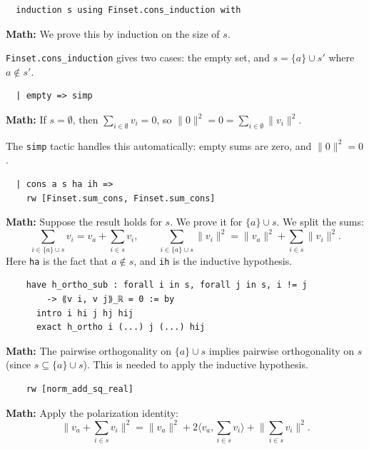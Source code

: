 \documentclass[11pt]{article}
\theoremstyle{plain}
\theoremstyle{definition}
\begin{document}
\begin{tcolorbox}[title=Line 6: Induction on the finite set]
\begin{lstlisting}
  induction s using Finset.cons_induction with
\end{lstlisting}
\textbf{Math:} We prove this by induction on the size of $s$.

\texttt{Finset.cons\_induction} gives two cases: the empty set, and
$s = \{a\} \cup s'$ where $a \notin s'$.
\end{tcolorbox}

\begin{tcolorbox}[title=Line 7: Base case (empty set)]
\begin{lstlisting}
  | empty => simp
\end{lstlisting}
\textbf{Math:} If $s = \emptyset$, then $\sum_{i \in \emptyset} v_i = 0$, so
$\|0\|^2 = 0 = \sum_{i \in \emptyset} \|v_i\|^2$.

The \texttt{simp} tactic handles this automatically: empty sums are zero, and
$\|0\|^2 = 0$.
\end{tcolorbox}

\begin{tcolorbox}[title=Lines 8--9: Inductive step setup]
\begin{lstlisting}
  | cons a s ha ih =>
    rw [Finset.sum_cons, Finset.sum_cons]
\end{lstlisting}
\textbf{Math:} Suppose the result holds for $s$. We prove it for $\{a\} \cup s$.
We split the sums:
\[
  \sum_{i \in \{a\} \cup s} v_i = v_a + \sum_{i \in s} v_i, \qquad
  \sum_{i \in \{a\} \cup s} \|v_i\|^2 = \|v_a\|^2 + \sum_{i \in s} \|v_i\|^2.
\]
Here \texttt{ha} is the fact that $a \notin s$, and \texttt{ih} is the inductive
hypothesis.
\end{tcolorbox}

\begin{tcolorbox}[title=Lines 10--13: Orthogonality restricted to $s$]
\begin{lstlisting}
    have h_ortho_sub : forall i in s, forall j in s, i != j
        -> ⟪v i, v j⟫_ℝ = 0 := by
      intro i hi j hj hij
      exact h_ortho i (...) j (...) hij
\end{lstlisting}
\textbf{Math:} The pairwise orthogonality on $\{a\} \cup s$ implies pairwise
orthogonality on $s$ (since $s \subseteq \{a\} \cup s$).
This is needed to apply the inductive hypothesis.
\end{tcolorbox}

\begin{tcolorbox}[title=Line 14: Expand the norm squared]
\begin{lstlisting}
    rw [norm_add_sq_real]
\end{lstlisting}
\textbf{Math:} Apply the polarization identity:
\[
  \|v_a + \textstyle\sum_{i \in s} v_i\|^2
  = \|v_a\|^2 + 2\bigl\langle v_a, \textstyle\sum_{i \in s} v_i\bigr\rangle
    + \bigl\|\textstyle\sum_{i \in s} v_i\bigr\|^2.
\]
\end{tcolorbox}
\end{document}
